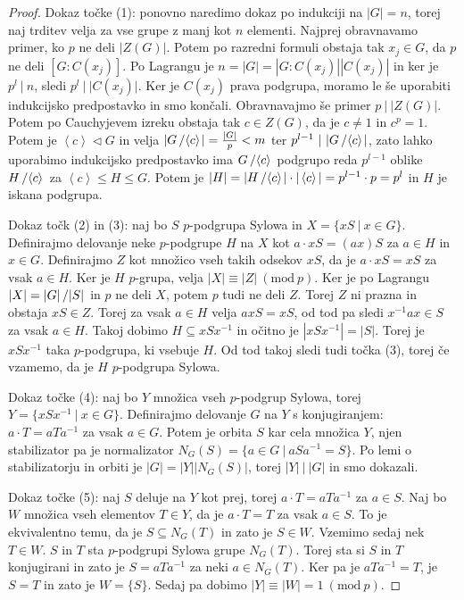 \documentclass[10pt, a4paper]{article}
\newenvironment{noticeC}{%
  \tcolorbox[%
  notitle,
  empty,
  enhanced,  %
  breakable,
  coltext=black, 
  fontupper=\rmfamily,
  noparskip,
  sharp corners,
  boxrule=-1pt,  %
  frame hidden,
  left=7pt,  %
  right=7pt,
  top=5pt,
  bottom=5pt,
  before skip=2.5ex plus 2pt,
  after skip=2.5ex plus 2pt,
  overlay unbroken and last={%
  },
  ]}
{\endtcolorbox}
\newenvironment{dokaz}%
  {\begin{noticeC}\begin{proof}}%
  {\end{proof}\end{noticeC}}
\newcommand{\quot}[2]{{\raisebox{0em}{$#1$}\left/\raisebox{0em}{$#2$}\right.}}
\newcommand{\gen}[1]{\left\langle #1 \right\rangle}
\newcommand{\Mod}[1]{\ (\mathrm{mod}\ #1)}
\begin{document}
\begin{dokaz}
  Dokaz točke (1): ponovno naredimo dokaz po indukciji na $|G| = n$,
  torej naj trditev velja za vse grupe z manj kot $n$ elementi.
  Najprej obravnavamo primer, ko $p$ ne deli $|Z(G)|$.
  Potem po razredni formuli obstaja tak $x_j \in G$,
  da $p$ ne deli $[G: C(x_j)]$.
  Po Lagrangu je $n = |G| = |G: C(x_j)| |C(x_j)|$ in ker je $p^l\ |\ n$, sledi $p^l\ |\ |C(x_j)|.$
  Ker je $C(x_j)$ prava podgrupa, moramo le še uporabiti indukcijsko predpostavko in smo končali.
  Obravnavajmo še primer $p\ |\ |Z(G)|$. Potem po Cauchyjevem izreku obstaja tak $c \in Z(G)$,
  da je $c \neq 1$ in $c^p = 1.$ Potem je $\gen{c} \lhd G$ in velja 
  $|\quot{G}{\gen{c}}| = \frac{|G|}{p} < m$ ter $p^{l-1}\ |\ |\quot{G}{\gen{c}}|$, zato lahko uporabimo indukcijsko 
  predpostavko ima $\quot{G}{\gen{c}}$ podgrupo reda $p^{l-1}$ oblike $\quot{H}{\gen{c}}$
  za $\gen{c} \leq H \leq G$.
  Potem je $|H| = |\quot{H}{\gen{c}}| \cdot |\gen{c}| = p^{l-1} \cdot p = p^l$ in $H$ je iskana podgrupa.

  Dokaz točk (2) in (3):
  naj bo $S$ $p$-podgrupa Sylowa in $X = \{xS\ |\ x \in G\}$.
  Definirajmo delovanje neke $p$-podgrupe $H$ na $X$ kot $a \cdot xS = (ax)S$
  za $a \in H$ in $x \in G$. Definirajmo $Z$ kot množico vseh takih odsekov $xS$,
  da je $a \cdot xS = xS$ za vsak $a \in H$.
  Ker je $H$ $p$-grupa, velja $|X| \equiv |Z| \Mod{p}$.
  Ker je po Lagrangu $|X| = \quot{|G|}{|S|}$ in $p$ ne deli $X$,
  potem $p$ tudi ne deli $Z$. Torej $Z$ ni prazna in obstaja $xS \in Z$.
  Torej za vsak $a \in H$ velja $axS = xS$, od tod pa sledi $x^{-1} a x \in S$ za vsak $a \in H$.
  Takoj dobimo $H \subseteq x S x^{-1}$ in očitno je $|xSx^{-1}| = |S|$.
  Torej je $xSx^{-1}$ taka $p$-podgrupa, ki vsebuje $H$.
  Od tod takoj sledi tudi točka (3), torej če vzamemo, da je $H$ $p$-podgrupa Sylowa.

  Dokaz točke (4): naj bo $Y$ množica vseh $p$-podgrup Sylowa, torej
  $Y = \{xSx^{-1}\ |\ x \in G\}$. Definirajmo delovanje $G$ na $Y$ s konjugiranjem:
  $a \cdot T = a T a^{-1}$ za vsak $a \in G$.
  Potem je orbita $S$ kar cela množica $Y$, njen stabilizator pa je normalizator
  $N_G (S) = \{a \in G\ |\ aSa^{-1} = S\}$.
  Po lemi o stabilizatorju in orbiti je $|G| = |Y| |N_G (S)|$, torej 
  $|Y|\ |\ |G|$ in smo dokazali.

  Dokaz točke (5): naj $S$ deluje na $Y$ kot prej, torej 
  $a \cdot T = a T a^{-1}$ za $a \in S$.
  Naj bo $W$ množica vseh elementov $T \in Y$,
  da je $a \cdot T = T$ za vsak $a \in S$.
  To je ekvivalentno temu, da je $S \subseteq N_G (T)$ in zato je $S \in W$.
  Vzemimo sedaj nek $T \in W$. $S$ in $T$ sta
  $p$-podgrupi Sylowa grupe $N_G (T)$. Torej sta si $S$ in $T$ konjugirani 
  in zato je $S = a T a^{-1}$ za neki $a \in N_G (T)$.
  Ker pa je $a T a^{-1} = T$, je $S = T$ in zato je $W = \{S\}$.
  Sedaj pa dobimo $|Y| \equiv |W| = 1 \Mod{p}$.
\end{dokaz}
\end{document}
